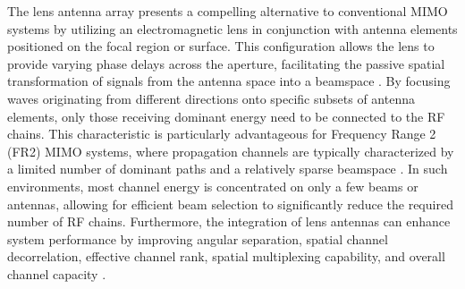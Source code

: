 The lens antenna array presents a compelling alternative to conventional MIMO systems by utilizing an electromagnetic lens in conjunction with antenna elements positioned on the focal region or surface. This configuration allows the lens to provide varying phase delays across the aperture, facilitating the passive spatial transformation of signals from the antenna space into a beamspace \cite{shen2019}. By focusing waves originating from different directions onto specific subsets of antenna elements, only those receiving dominant energy need to be connected to the RF chains. This characteristic is particularly advantageous for Frequency Range 2 (FR2) MIMO systems, where propagation channels are typically characterized by a limited number of dominant paths and a relatively sparse beamspace \cite{Zeng2016}. In such environments, most channel energy is concentrated on only a few beams or antennas, allowing for efficient beam selection to significantly reduce the required number of RF chains. Furthermore, the integration of lens antennas can enhance system performance by improving angular separation, spatial channel decorrelation, effective channel rank, spatial multiplexing capability, and overall channel capacity \cite{Zeng2016}.



